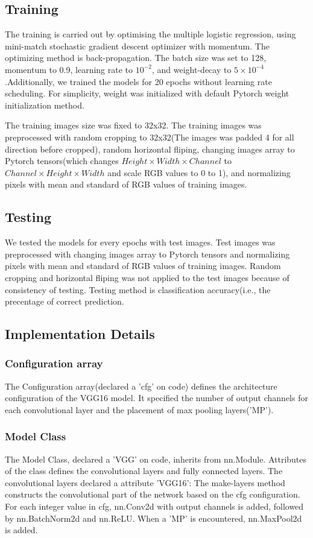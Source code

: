 \documentclass[extendedabs]{bmvc2k}
\begin{document}
\subsection{Training} \label{trainingsection}
The training is carried out by optimising the multiple logistic regression, using mini-match stochastic gradient descent optimizer with momentum. The optimizing method is back-propagation\cite{backpropagation}.
The batch size was set to 128, momentum to 0.9, learning rate to $10^{-2}$, and weight-decay to  $5\times10^{-4}$.Additionally, we trained the models for 20 epochs without learning rate scheduling. For simplicity, weight was initialized with default Pytorch weight initialization method.

The training images size was fixed to 32x32. The training images was preprocessed with random cropping to 32x32(The images was padded 4 for all direction before cropped), random horizontal fliping, changing images array to Pytorch tensors(which changes $Height\times Width\times Channel$ to $Channel\times Height\times Width$ and scale RGB values to 0 to 1), and normalizing pixels with mean and standard of RGB values of training images.

\subsection{Testing}
We tested the models for every epochs with test images. Test images was preprocessed with changing images array to Pytorch tensors and normalizing pixels with mean and standard of RGB values of training images. Random cropping and horizontal fliping was not applied to the test images because of consistency of testing. Testing method is classification accuracy(i.e., the precentage of correct prediction.
\subsection{Implementation Details}
\subsubsection{Configuration array}
The Configuration array(declared a 'cfg' on code) defines the architecture configuration of the VGG16 model. It specified the number of output channels for each convolutional layer and the placement of max pooling layers('MP').
\subsubsection{Model Class}
The Model Class, declared a 'VGG' on code, inherits from nn.Module. Attributes of the class defines the convolutional layers and fully connected layers. The convolutional layers declared a attribute 'VGG16': The make-layers method constructs the convolutional part of the network based on the cfg configuration. For each integer value in cfg, nn.Conv2d with output channels is added, followed by nn.BatchNorm2d and nn.ReLU. When a 'MP' is encountered, nn.MaxPool2d is added.
\end{document}
